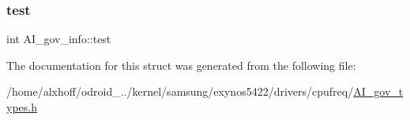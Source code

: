 \subsubsection{\texorpdfstring{test}{test}}
{\footnotesize\ttfamily int A\+I\+\_\+gov\+\_\+info\+::test}



The documentation for this struct was generated from the following file\+:\begin{DoxyCompactItemize}
\item 
/home/alxhoff/odroid\+\_../kernel/samsung/exynos5422/drivers/cpufreq/\hyperlink{AI__gov__types_8h}{A\+I\+\_\+gov\+\_\+types.\+h}\end{DoxyCompactItemize}
